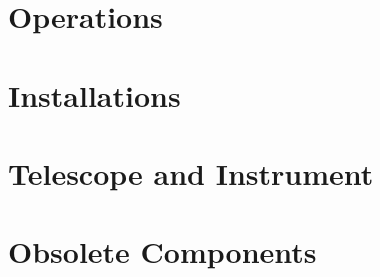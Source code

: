 \documentclass{report}
\begin{document}



\part{Operations}





\part{Installations}









\part{Telescope and Instrument}





\part{Obsolete Components}
\appendix



\end{document}
